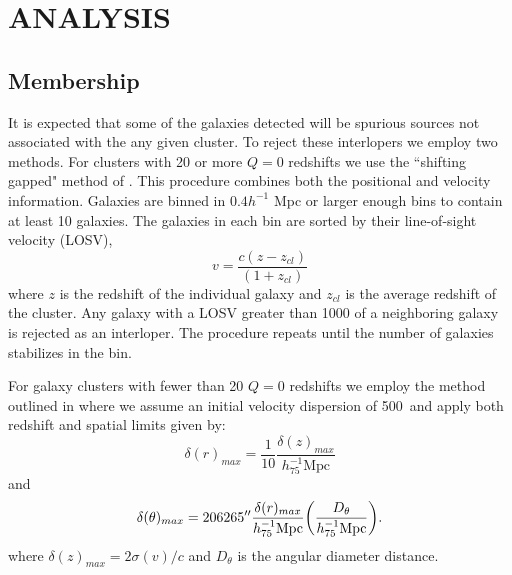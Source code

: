 \documentclass[apj, revtex4]{emulateapj}
\begin{document}
\section{ANALYSIS}

\subsection{Membership}
It is expected that some of the galaxies detected will be spurious sources not associated with the any given cluster. To reject these interlopers we employ two methods. For clusters with 20 or more $Q=0$ redshifts we use the  ``shifting gapped" method of \cite{Fadda1996}. This procedure combines both the positional and velocity information. Galaxies are binned in $0.4h^{-1}$ Mpc or larger enough bins to contain at least 10 galaxies. The galaxies in each bin are sorted by their line-of-sight velocity (LOSV),
\begin{equation}
	v = \frac{c (z-z_{cl})}{(1+z_{cl})}
\end{equation}
where $z$ is the redshift of the individual galaxy and $z_{cl}$ is the average redshift of the cluster. Any galaxy with a LOSV greater than 1000 \kms of a neighboring galaxy is rejected as an interloper. The procedure repeats until the number of galaxies stabilizes in the bin.

For galaxy clusters with fewer than 20 $Q=0$ redshifts we employ the method outlined in \cite{Connelly2012,Wilman2005} where we assume an initial velocity dispersion of 500\kms\ and apply both redshift and spatial limits given by:
\begin{equation}
	\delta(r)_{max} = \frac{1}{10}\frac{\delta(z)_{max}}{h_{75}^{-1}\mathrm{Mpc}}
\end{equation}
and
\begin{equation}
	\delta(\theta)_{max} = 206265'' \frac{\delta(r)_{max}}{h_{75}^{-1}\mathrm{Mpc}} \bigg{(}\frac{D_{\theta}}{h_{75}^{-1}\mathrm{Mpc}} \bigg{)}.
\end{equation}
where $\delta(z)_{max} = 2\sigma(v)/c$ and $D_\theta$ is the angular diameter distance.
\end{document}
